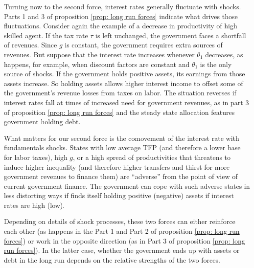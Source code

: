 \documentclass[thmsb,11pt]{article}
\begin{document}

Turning now to the second force,  interest rates generally fluctuate
with  shocks.  Parts 1 and 3 of  proposition \ref{prop: long run forces} indicate what drives those  fluctuations. Consider again the example of a
decrease in productivity of high skilled agent. If the  tax rate  $\tau $ is left unchanged,
the government faces a shortfall of revenues. Since
$g$ is constant, the
government requires  extra sources of revenues. But  suppose that
the interest rate increases whenever $\theta_1 $ decreases, as happens, for
example, when  discount factors are
constant and $\theta_1 $ is the only source of shocks. If the government holds positive assets, its earnings from those assets increase.
 So holding assets allows higher interest income
 to offset some of the government's revenue losses from taxes on labor.  The situation reverses if interest rates fall at
times of increased need for government revenues, as in
 part 3 of  proposition \ref{prop: long run forces} and the steady state allocation features government holding debt.


 What matters for our second force is the comovement of the interest rate with fundamentals shocks. States with low average TFP (and therefore a lower base for labor taxes), high $g$, or a high spread of productivities that threatens to induce higher inequality (and therefore higher  transfers and thirst for more  government  revenues to finance them) are ``adverse'' from the point of view of current government finance. The government can cope with such adverse states in less distorting ways if finds itself holding positive (negative) assets if interest rates are  high (low). 

 
Depending on  details of shock processes, these two forces can
either reinforce each other (as happens in the Part 1 and Part 2 %
 of  proposition \ref{prop: long run forces}) or work in the opposite direction (as in Part 3 of  proposition \ref{prop: long run forces}). In the latter case, whether the
government ends up with assets or debt in the long run depends on the
relative strengths of the two forces. 
 
\end{document}
